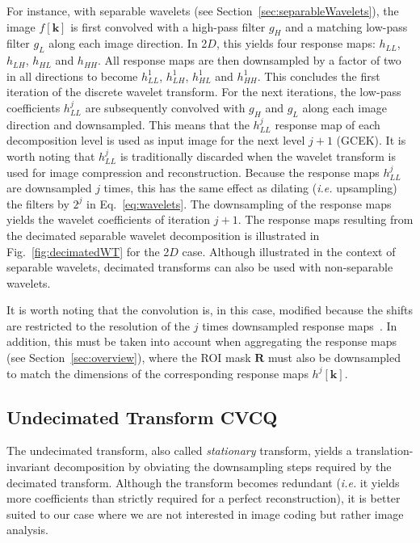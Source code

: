 \documentclass[fleqn,a4paper,oneside,openany]{book}
\newcommand\id[1]{{\hfill\normalsize{\idfont #1}}}
\newcommand\textid[1]{{\normalsize{\idfont #1}}}
\begin{document}
For instance, with separable wavelets (see Section~\ref{sec:separableWavelets}), the image $f[\boldsymbol{k}]$ is first convolved with a high-pass filter $g_H$ and a matching low-pass filter $g_L$ along each image direction.
In 2$D$, this yields four response maps: $h_{LL}$, $h_{LH}$, $h_{HL}$ and $h_{HH}$.
All response maps are then downsampled by a factor of two in all directions to become $h_{LL}^1$, $h_{LH}^1$, $h_{HL}^1$ and $h_{HH}^1$.
This concludes the first iteration of the discrete wavelet transform.
%
For the next iterations, the low-pass coefficients $h_{LL}^j$ are subsequently convolved with $g_H$ and $g_L$ along each image direction and downsampled. 
This means that the $h_{LL}^j$ response map of each decomposition level is used as input image for the next level $j+1$ (\textid{GCEK}).
It is worth noting that $h_{LL}^j$ is traditionally discarded when the wavelet transform is used for image compression and reconstruction.
Because the response maps $h_{LL}^j$ are downsampled $j$ times, this has the same effect as dilating (\textit{i.e.} upsampling) the filters by $2^j$ in Eq.~\eqref{eq:wavelets}.
The downsampling of the response maps yields the wavelet coefficients of iteration $j+1$.
The response maps resulting from the decimated separable wavelet decomposition is illustrated in Fig.~\ref{fig:decimatedWT} for the 2$D$ case.
Although illustrated in the context of separable wavelets, decimated transforms can also be used with non-separable wavelets.

It is worth noting that the convolution is, in this case, modified because the shifts are restricted to the resolution of the $j$ times downsampled response maps~\cite{Dau1992}. In addition, this must be taken into account when aggregating the response maps (see Section~\ref{sec:overview}), where the ROI mask $\boldsymbol{R}$ must also be downsampled to match the dimensions of the corresponding response maps $h^j[\boldsymbol{k}]$.

\subsection[Undecimated Transform]{Undecimated Transform \id{CVCQ}}\label{sec:undecimatedWT}
%
The undecimated transform, also called \emph{stationary} transform, yields a translation-invariant decomposition by obviating the downsampling steps required by the decimated transform. Although the transform becomes redundant (\textit{i.e.} it yields more coefficients than strictly required for a perfect reconstruction), it is better suited to our case where we are not interested in image coding but rather image analysis.
\end{document}
